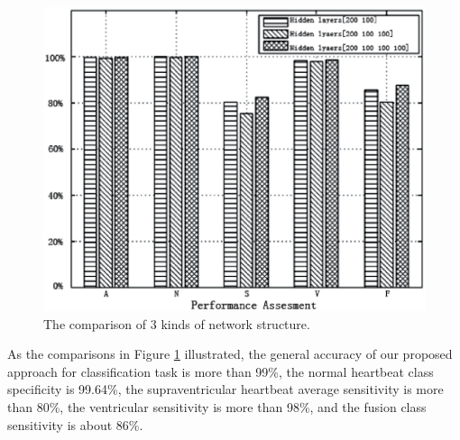 \documentclass[journal]{IEEEtran}
\begin{document}
\begin{figure}[]
\centering
\includegraphics[width=3.2 in]{eps/Figure4.eps}
\caption{The comparison of 3 kinds of network structure.}
\label{figure4}
\end{figure}
As the comparisons in Figure \ref{figure4} illustrated, the general accuracy of our proposed approach for classification task is more than 99\%, the normal heartbeat class specificity is 99.64\%, the supraventricular heartbeat average sensitivity is more than 80\%, the ventricular sensitivity is more than 98\%, and the fusion class sensitivity is about 86\%.

\end{document}
